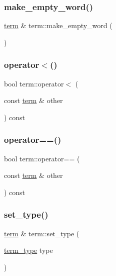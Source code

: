 \subsubsection{\texorpdfstring{make\_empty\_word()}{make\_empty\_word()}}
{\footnotesize\ttfamily \mbox{\hyperlink{classterm}{term}} \& term\+::make\+\_\+empty\+\_\+word (\begin{DoxyParamCaption}{ }\end{DoxyParamCaption})}

\mbox{\label{classterm_a1ad8c5bd2ccda41a256096a6002ac882}} 
\subsubsection{\texorpdfstring{operator$<$()}{operator<()}}
{\footnotesize\ttfamily bool term\+::operator$<$ (\begin{DoxyParamCaption}\item[{const \mbox{\hyperlink{classterm}{term}} \&}]{other }\end{DoxyParamCaption}) const}

\mbox{\label{classterm_a0bcef0b018791098b24cb1f3d7df2d68}} 
\subsubsection{\texorpdfstring{operator==()}{operator==()}}
{\footnotesize\ttfamily bool term\+::operator== (\begin{DoxyParamCaption}\item[{const \mbox{\hyperlink{classterm}{term}} \&}]{other }\end{DoxyParamCaption}) const}

\mbox{\label{classterm_acde3aa6aa227326fa8bef87952023d4c}} 
\subsubsection{\texorpdfstring{set\_type()}{set\_type()}}
{\footnotesize\ttfamily \mbox{\hyperlink{classterm}{term}} \& term\+::set\+\_\+type (\begin{DoxyParamCaption}\item[{\mbox{\hyperlink{term_8h_a01c5d13b4b82a95ffc3de77e52c7603b}{term\+\_\+type}}}]{type }\end{DoxyParamCaption})}

